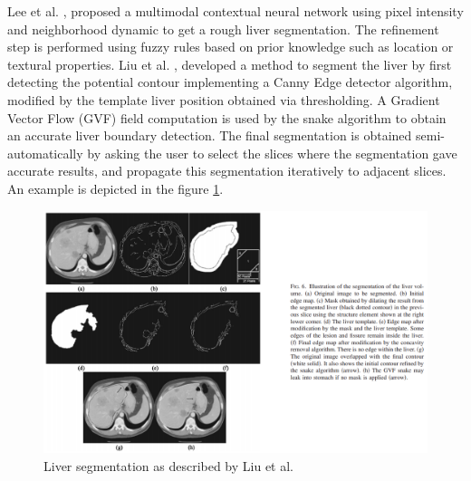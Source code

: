 \documentclass[]{article}
\begin{document}
Lee et al. \cite{Lee2003}, proposed a multimodal contextual neural network using
pixel intensity and neighborhood dynamic to get a rough liver
segmentation. The refinement step is performed using fuzzy rules based
on prior knowledge such as location or textural properties.
Liu et al. \cite{Liu2005}, developed a method to segment the liver by first detecting the potential
contour implementing a Canny Edge detector algorithm, modified by the
template liver position obtained via thresholding. A Gradient Vector
Flow (GVF) field computation is used by the snake algorithm to obtain an
accurate liver boundary detection. The final segmentation is obtained
semi-automatically by asking the user to select the slices where the
segmentation gave accurate results, and propagate this segmentation
iteratively to adjacent slices. An example is depicted in the figure \ref{LiuGVF}.
\begin{figure} [ht!]
	\centering
	\includegraphics[width=0.7\linewidth]{images/image15}
	\caption{Liver segmentation as described by Liu et al. \cite{Liu2005}}
	\label{LiuGVF}
\end{figure}
\end{document}
